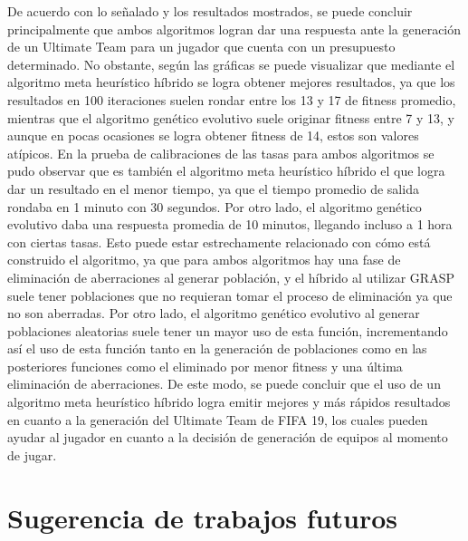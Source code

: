 \documentclass{article}
\begin{document}
De acuerdo con lo señalado y los resultados mostrados, se puede concluir principalmente que ambos algoritmos logran dar una respuesta ante la generación de un Ultimate Team para un jugador que cuenta con un presupuesto determinado. No obstante, según las gráficas se puede visualizar que mediante el algoritmo meta heurístico híbrido se logra obtener mejores resultados, ya que los resultados en 100 iteraciones suelen rondar entre los 13 y 17 de fitness promedio, mientras que el algoritmo genético evolutivo suele originar fitness entre 7 y 13, y aunque en pocas ocasiones se logra obtener fitness de 14, estos son valores atípicos.\newline
En la prueba de calibraciones de las tasas para ambos algoritmos se pudo observar que es también el algoritmo meta heurístico híbrido el que logra dar un resultado en el menor tiempo, ya que el tiempo promedio de salida rondaba en 1 minuto con 30 segundos. Por otro lado, el algoritmo genético evolutivo daba una respuesta promedia de 10 minutos, llegando incluso a 1 hora con ciertas tasas.\newline
Esto puede estar estrechamente relacionado con cómo está construido el algoritmo, ya que para ambos algoritmos hay una fase de eliminación de aberraciones al generar población, y el híbrido al utilizar GRASP suele tener poblaciones que no requieran tomar el proceso de eliminación ya que no son aberradas. Por otro lado, el algoritmo genético evolutivo al generar poblaciones aleatorias suele tener un mayor uso de esta función, incrementando así el uso de esta función tanto en la generación de poblaciones como en las posteriores funciones como el eliminado por menor fitness y una última eliminación de aberraciones.\newline
De este modo, se puede concluir que el uso de un algoritmo meta heurístico híbrido logra emitir mejores y más rápidos resultados en cuanto a la generación del Ultimate Team de FIFA 19, los cuales pueden ayudar al jugador en cuanto a la decisión de generación de equipos al momento de jugar.

\section{Sugerencia de trabajos futuros}
\end{document}
